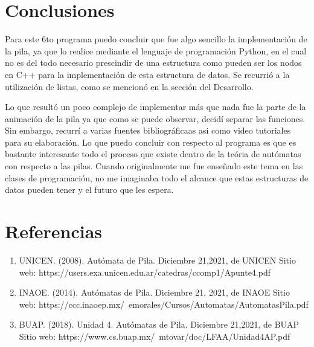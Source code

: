 \documentclass{article}
\begin{document}
	\section*{Conclusiones}
	Para este 6to programa puedo concluir que fue algo sencillo la implementación de la pila, ya que lo realice mediante el lenguaje de programación Python, en el cual no es del todo necesario prescindir de una estructura como pueden ser los nodos en C++ para la implementación de esta estructura de datos. Se recurrió a la utilización de listas, como se mencionó en la sección del Desarrollo. 
	
	Lo que resultó un poco complejo de implementar más que nada fue la parte de la animación de la pila ya que como se puede observar, decidí separar las funciones. Sin embargo, recurrí a varias fuentes bibliográficaas asi como video tutoriales para su elaboración. 
	Lo que puedo concluir con respecto al programa es que es bastante interesante todo el proceso que existe dentro de la teória de autómatas con respecto a las pilas. Cuando originalmente me fue enseñado este tema en las clases de programación, no me imaginaba todo el alcance que estas estructuras de datos pueden tener y el futuro que les espera.
	
	\section*{Referencias}
	\begin{enumerate}
		\item UNICEN. (2008). Autómata de Pila. Diciembre 21,2021, de UNICEN Sitio web: https://users.exa.unicen.edu.ar/catedras/ccomp1/Apunte4.pdf
		
		\item INAOE. (2014). Autómatas de Pila. Diciembre 21, 2021, de INAOE Sitio web:  https://ccc.inaoep.mx/~emorales/Cursos/Automatas/AutomatasPila.pdf
		
		\item BUAP. (2018). Unidad 4. Autómatas de Pila. Diciembre 21,2021, de BUAP Sitio web: https://www.cs.buap.mx/~mtovar/doc/LFAA/Unidad4AP.pdf
	\end{enumerate}
	
\end{document}
